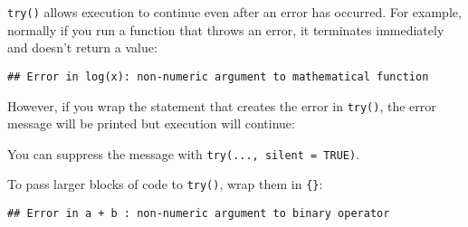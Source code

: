 \texttt{try()} allows execution to continue even after an error has
occurred. For example, normally if you run a function that throws an
error, it terminates immediately and doesn't return a value:

\begin{Shaded}
\begin{Highlighting}[]
\StringTok{ }
\NormalTok{\}}
\NormalTok{(}\NormalTok{)}
\end{Highlighting}
\end{Shaded}

\begin{verbatim}
## Error in log(x): non-numeric argument to mathematical function
\end{verbatim}

However, if you wrap the statement that creates the error in
\texttt{try()}, the error message will be printed but execution will
continue:

\begin{Shaded}
\begin{Highlighting}[]
\StringTok{ }
  \NormalTok{(}
\NormalTok{\}}
\NormalTok{(}\NormalTok{)}
\end{Highlighting}
\end{Shaded}

You can suppress the message with \texttt{try(...,\ silent\ =\ TRUE)}.

To pass larger blocks of code to \texttt{try()}, wrap them in
\texttt{\{\}}:

\begin{Shaded}
\begin{Highlighting}[]
\NormalTok{(\{}
\StringTok{ }
\OperatorTok{+}\StringTok{ }
\NormalTok{\})}
\end{Highlighting}
\end{Shaded}

\begin{verbatim}
## Error in a + b : non-numeric argument to binary operator
\end{verbatim}


